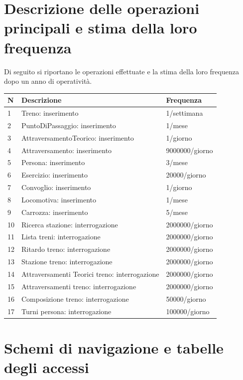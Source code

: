 \documentclass[a4paper,12pt]{report}
\begin{document}
	\section{Descrizione delle operazioni principali e stima della loro frequenza}
	Di seguito si riportano le operazioni effettuate e la stima della loro frequenza dopo un anno di operatività.
	\begin{table}[H]
	\centering
	\begin{tabular}{|l|l|l|}
		\hline \textbf{N} & \textbf{Descrizione} & \textbf{Frequenza} \\
		\hline 1 & Treno: inserimento & 1/settimana \\
		\hline 2 & PuntoDiPassaggio: inserimento & 1/mese \\
		\hline 3 & AttraversamentoTeorico: inserimento & 1/giorno \\
		\hline 4 & Attraversamento: inserimento & 9000000/giorno \\
		\hline 5 & Persona: inserimento & 3/mese \\
		\hline 6 & Esercizio: inserimento & 20000/giorno \\
		\hline 7 & Convoglio: inserimento & 1/giorno \\
		\hline 8 & Locomotiva: inserimento & 1/mese \\
		\hline 9 & Carrozza: inserimento & 5/mese \\
		\hline 10 & Ricerca stazione: interrogazione & 2000000/giorno \\
		\hline 11 & Lista treni: interrogazione & 2000000/giorno \\
		\hline 12 & Ritardo treno: interrogazione & 2000000/giorno \\
		\hline 13 & Stazione treno: interrogazione & 2000000/giorno \\
		\hline 14 & Attraversamenti Teorici treno: interrogazione & 2000000/giorno \\
		\hline 15 & Attraversamenti treno: interrogazione & 2000000/giorno \\
		\hline 16 & Composizione treno: interrogazione & 50000/giorno \\
		\hline 17 & Turni persona: interrogazione & 100000/giorno \\
		\hline
	\end{tabular}
	\end{table}
	\section{Schemi di navigazione e tabelle degli accessi}
\end{document}
